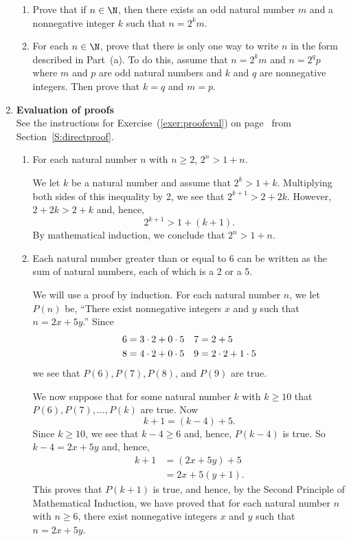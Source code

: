 \begin{enumerate}
\xitem \label{exer:specialFTA} \begin{enumerate}
\item Prove that if $n \in \N$, then there exists an odd natural number $m$ and a nonnegative integer $k$ such that $n = 2^k m$.

\item For each $n \in \N$, prove that there is only one way to write $n$ in the form described in Part~(a).  To do this, assume that $n = 2^k m$ and $n = 2^q p$ where $m$ and 
$p$ are odd natural numbers and $k$ and $q$ are nonnegative integers.  Then prove that 
$k = q$ and $m = p$. 
\end{enumerate}



\item \textbf{Evaluation of proofs}  \hfill \\
See the instructions for Exercise~(\ref{exer:proofeval}) on 
page~\pageref{exer:proofeval} from Section~\ref{S:directproof}.
\begin{enumerate}
\item For each natural number $n$ with $n \geq 2$, $2^n > 1 + n$.
\begin{myproof}
We let $k$ be a natural number and assume that $2^k > 1 + k$.  Multiplying both sides of this inequality by 2, we see that $2^{k+1} > 2 + 2k$.  However, $2 + 2k > 2 + k$ and, hence,
\[
2^{k+1} > 1 + \left(k + 1 \right)\!.
\]
By mathematical induction, we conclude that $2^n > 1 + n$.
\end{myproof}

\item Each natural number greater than or equal to 6 can be written as the sum of natural numbers, each of which is a 2 or a 5.

\begin{myproof}
We will use a proof by induction.  For each natural number $n$, we let $P( n )$ be, 
``There exist nonnegative integers $x$ and $y$ such that $n = 2x + 5y$.''
Since
\begin{align} \notag
6 &= 3 \cdot 2 + 0 \cdot 5  &  7 &= 2 + 5 \\ \notag
8 &= 4 \cdot 2 + 0 \cdot 5  &  9 &= 2 \cdot 2 + 1 \cdot 5 \notag 
\end{align}
we see that $P(6 ), P(7 ), P(8 )$, and $P( 9 )$ are true.

We now suppose that for some natural number $k$ with $k \geq 10$ that 
$P(6 ), P (7 ), \ldots, P (k )$ are true.  Now
\[
k + 1 = \left(k - 4 \right) + 5.
\]
Since $k \geq 10$, we see that $k - 4 \geq 6$ and, hence, $P(k - 4 )$ is true.  So
$k - 4 = 2x + 5y$ and, hence,
\[
\begin{aligned}
k + 1 &= \left(2x + 5y \right) + 5 \\
      &= 2x + 5 \left(y + 1 \right)\!.
\end{aligned}
\]
This proves that $P(k + 1 )$ is true, and hence, by the Second Principle of Mathematical Induction, we have proved that for each natural number $n$ with $n \geq 6$, there exist nonnegative integers $x$ and $y$ such that $n = 2x + 5y$.     
\end{myproof}
\end{enumerate}
\end{enumerate}


